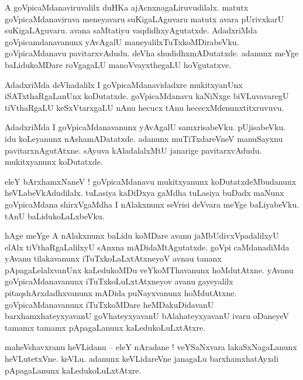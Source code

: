 \documentclass{article}
\begin{document}
\begin{mn}%
A goVpicaMdanaviruvalilx duHKa ajAcnxnagaLiruvudilalx. matutx goVpicaMdanaviruva meneyavaru 
suKigaLAguvaru matutx avara pUrivxkarU suKigaLAguvaru. avana saMtatiyu vaqdidhxyAgutatxde. 
AdadxriMda goVpicamdanavanunx yAvAgalU maneyalilxTuTxkoMDirabeVku. goVpicaMdanavu pavitarxvAdudu. 
deVha shudidhxmADutatxde. adanunx meYge baLidukoMDare roVgagaLU manoVvayxthegaLU hoVgutatxve.
\end{mn}

\begin{mn}%
AdadxriMda deVhadalilx I goVpicaMdanavidadxre mukitxyanUnx iSATxthaRgaLanUnx koDutatxde. 
goVpicaMdanavu kaNiNxge biVLuvavaregU tiVthaRgaLU keSxVtarxgaLU nAnu hecucx tAnu 
hececxMdenunxtitxruvuvu.
\end{mn}

\begin{mn}%
AdadxriMda I goVpicaMdanavanunx yAvAgalU samxrisabeVku. pUjisabeVku. idu koLeyanunx 
nAshamADatatxde. adanunx muTiTxdareVneV manuSayxnu pavitarxnAgutAtxne. sAyuva kAladalalxMtU 
janarige pavitarxvAdudu. mukitxyanunx koDutatxde.
\end{mn}

\begin{mn}%
eleY bArxhamxNaneV ! goVpicaMdanavu mukitxyanunx koDutatxdeMbudanunx heVLabeVkAdudilalx. tuLasiya 
kaDiDxya gaMdha tuLasiya buDadx maNunx goVpicaMdana shirxVgaMdha I nAlakxnunx seVrisi deVvara 
meYge baLiyabeVku. tAnU baLidukoLaLxbeVku.
\end{mn}

\begin{mn}%
hAge meYge A nAlakxnunx baLidu koMDare avanu jaMbUdivxVpadalilxyU elAlx tiVthaRgaLalilxyU sAnxna 
mADidaMtAgutatxde. goVpi caMdanadiMda yAvanu tilakavanunx iTuTxkoLaLxtAtxneyoV avnau tananx 
pApagaLelalxvanUnx kaLedukoMDu veYkoMThavanunx hoMdutAtxne. yAvanu goVpicaMdanavanunx 
iTuTxkoLuLxtAtxneyov avanu gayeyalilx pitaqshArxdadhxvanunx mADida puNayxvanunx hoMdutAtxne. 
goVpicaMdanavanunx iTuTxkoMDare heMDakuDidavanU barxhamxhateyxyavanU goVhateyxyavanU 
bAlahateyxyavanU ivaru oDaneyeV tamamx tamamx pApagaLanunx kaLedukoLuLxtAtxre.
\end{mn}


\begin{mn}%
maheVshavxranu heVLidanu -- eleY nAradane ! veYSaNxvara lakaSxNagaLanunx heVLutetxVne. keVLu. 
adanunx keVLidareVne janagaLu barxhamxhatAyxdi pApagaLanunx kaLedukoLuLxtAtxre.
\end{mn}
\end{document}
